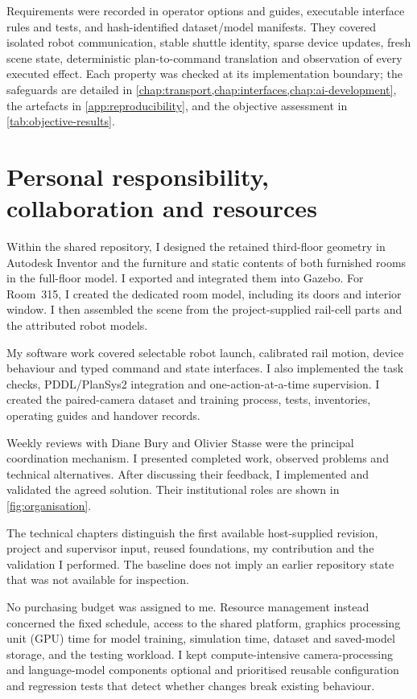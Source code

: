 Requirements were recorded in operator options and guides, executable interface
rules and tests, and hash-identified dataset/model manifests. They covered
isolated robot communication, stable shuttle identity, sparse device updates,
fresh scene state, deterministic plan-to-command translation and observation of
every executed effect. Each property was checked at its implementation boundary;
the safeguards are detailed in
\cref{chap:transport,chap:interfaces,chap:ai-development}, the artefacts in
\cref{app:reproducibility}, and the objective assessment in
\cref{tab:objective-results}.

\section{Personal responsibility, collaboration and resources}

Within the shared repository, I designed the retained third-floor geometry in
Autodesk Inventor and the furniture and static contents of both furnished rooms
in the full-floor model. I exported and integrated them into Gazebo. For
Room~315, I created the dedicated room model, including its doors and interior
window. I then assembled the scene from the project-supplied rail-cell parts and
the attributed robot models.

My software work covered selectable robot launch, calibrated rail motion,
device behaviour and typed command and state interfaces. I also implemented the
task checks, PDDL/PlanSys2 integration and one-action-at-a-time supervision. I
created the paired-camera dataset and training process, tests, inventories,
operating guides and handover records.

Weekly reviews with Diane Bury and Olivier Stasse were the principal
coordination mechanism. I presented completed work, observed problems and
technical alternatives. After discussing their feedback, I implemented and
validated the agreed solution. Their institutional roles are shown in
\cref{fig:organisation}.

The technical chapters distinguish the first available host-supplied revision,
project and supervisor input, reused foundations, my contribution and the
validation I performed. The baseline does not imply an earlier repository state
that was not available for inspection.

No purchasing budget was assigned to me. Resource management instead concerned
the fixed schedule, access to the shared platform, graphics processing unit
(GPU) time for model training, simulation time, dataset and saved-model storage,
and the testing workload. I kept compute-intensive camera-processing and
language-model components optional and prioritised reusable configuration and
regression tests that detect whether changes break existing behaviour.

